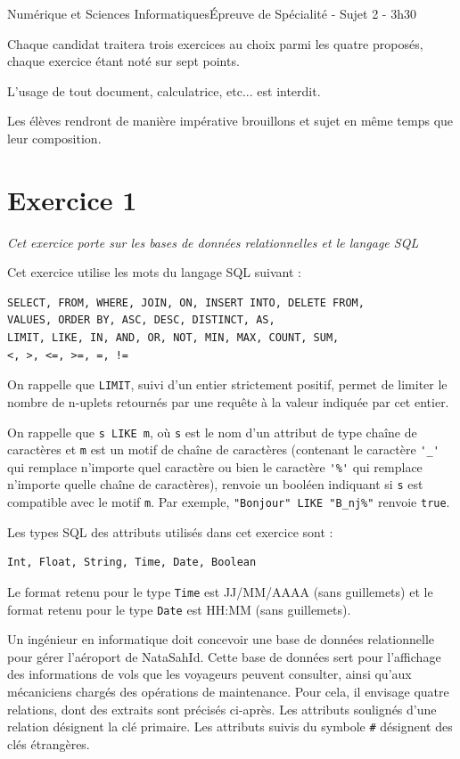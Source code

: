 \documentclass[11pt,a4paper,french,twoside]{PMCours}
\begin{document}
{Numérique et Sciences Informatiques}{Épreuve de Spécialité - Sujet 2 - 3h30}

\medskip
{\large Chaque candidat traitera trois exercices au choix parmi les quatre proposés, chaque exercice étant noté sur sept points.

\medskip
L'usage de tout document, calculatrice, etc... est interdit.

\medskip
Les élèves rendront de manière impérative brouillons et sujet en même temps que leur composition.}

\newpage
\section*{Exercice 1}
\emph{Cet exercice porte sur les bases de données relationnelles et le langage SQL}

\medskip
Cet exercice utilise les mots du langage SQL suivant :
\begin{verbatim}
SELECT, FROM, WHERE, JOIN, ON, INSERT INTO, DELETE FROM, 
VALUES, ORDER BY, ASC, DESC, DISTINCT, AS,
LIMIT, LIKE, IN, AND, OR, NOT, MIN, MAX, COUNT, SUM,
<, >, <=, >=, =, !=
\end{verbatim} 
On rappelle que \verb'LIMIT', suivi d'un entier strictement positif, permet de limiter le nombre de n-uplets retournés par une requête à la valeur indiquée par cet entier. 

On rappelle que \verb's LIKE m', où \verb's' est le nom d'un attribut de type chaîne de caractères et \verb'm' est un motif de chaîne de caractères (contenant le caractère \verb"'_'" qui remplace n'importe quel caractère ou bien le caractère \verb"'%'" qui remplace n'importe quelle chaîne de caractères), renvoie un booléen indiquant si \verb's' est compatible avec le motif \verb'm'. Par exemple, \verb'"Bonjour" LIKE "B_nj%"' renvoie \verb'true'.

Les types SQL des attributs utilisés dans cet exercice sont : 
\begin{verbatim}
Int, Float, String, Time, Date, Boolean
\end{verbatim} 
Le format retenu pour le type \verb'Time' est JJ/MM/AAAA (sans guillemets) et le format retenu pour le type \verb'Date' est HH:MM (sans guillemets).

\medskip
Un ingénieur en informatique doit concevoir une base de données relationnelle pour gérer l'aéroport de NataSahId. Cette base de données sert pour l'affichage des informations de vols que les voyageurs peuvent consulter, ainsi qu'aux mécaniciens chargés des opérations de maintenance. Pour cela, il envisage quatre relations, dont des extraits sont précisés ci-après. Les attributs soulignés d'une relation désignent la clé primaire. Les attributs suivis du symbole \verb'#' désignent des clés étrangères.
\end{document}
